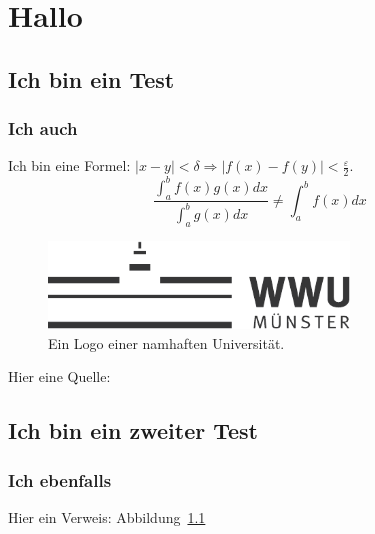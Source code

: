 


	
	
	\chapter{Hallo}
	\section{Ich bin ein Test}
	\subsection{Ich auch}
	Ich bin eine Formel: $|x-y| < \delta \Rightarrow |f(x) - f(y)| < \frac{\varepsilon}{2}$.
	\lipsum[5]
	\[
		\frac{\int_{a}^{b} f(x)g(x) dx}{\int_{a}^{b} g(x) dx} \neq \int_{a}^{b} f(x) dx
	\]
	
	\begin{figure}[h]
		\centering
		\includegraphics[keepaspectratio,width=8cm]{img/wwulogo17.pdf}
		\caption{Ein Logo einer namhaften Universität.}
		\label{fig:wwulogo}
	\end{figure}

	Hier eine Quelle: \cite[S. 42]{sicp}

	\lipsum

	\index{\verb+\tableofcontents+}

	\section{Ich bin ein zweiter Test}
	\subsection{Ich ebenfalls}

	Hier ein Verweis: Abbildung~\ref{fig:wwulogo}

	\lipsum
	\lipsum

	
